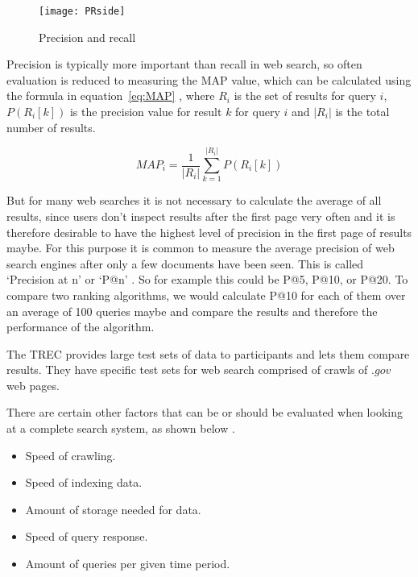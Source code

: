 \begin{figure}[!htbp]
  \centering
  \texttt{[image: PRside]}
  \caption[Precision and recall]{Precision and recall \autocite{Wikimedia2014}}
\label{fig:PR}
\end{figure}

Precision is typically more important than recall in web search, so often evaluation is reduced to measuring the \acf{MAP} value\marginpar{$\bm{\Sigma}$~\ref{eq:MAP}}, which can be calculated using the formula in equation~\ref{eq:MAP} \autocite{Baeza-Yates2011}, where $R_i$ is the set of results for query $i$, $P(R_i[k])$ is the precision value for result $k$ for query $i$ and $|R_i|$ is the total number of results.

\begin{equation}
  MAP_i = \frac{1}{|R_i|} \sum_{k=1}^{|R_i|} P(R_i[k])
\label{eq:MAP}
\end{equation}

But for many web searches it is not necessary to calculate the average of all results, since users don't inspect results after the first page very often and it is therefore desirable to have the highest level of precision in the first page of results maybe. For this purpose it is common to measure the average precision of web search engines after only a few documents have been seen. This is called `Precision at n' or `P@n' \autocite{Baeza-Yates2011}. So for example this could be P@5, P@10, or P@20. To compare two ranking algorithms, we would calculate P@10 for each of them over an average of 100 queries maybe and compare the results and therefore the performance of the algorithm.

The \acf{TREC} \autocite{Nist2016} provides large test sets of data \autocite{Trec2011} to participants and lets them compare results. They have specific test sets for web search comprised of crawls of $.gov$ web pages.

There are certain other factors that can be or should be evaluated when looking at a complete search system, as shown below \autocite{Baeza-Yates2011}. 

\begin{itemize}
  \item Speed of crawling.
  \item Speed of indexing data.
  \item Amount of storage needed for data.
  \item Speed of query response.
  \item Amount of queries per given time period.
\end{itemize}

